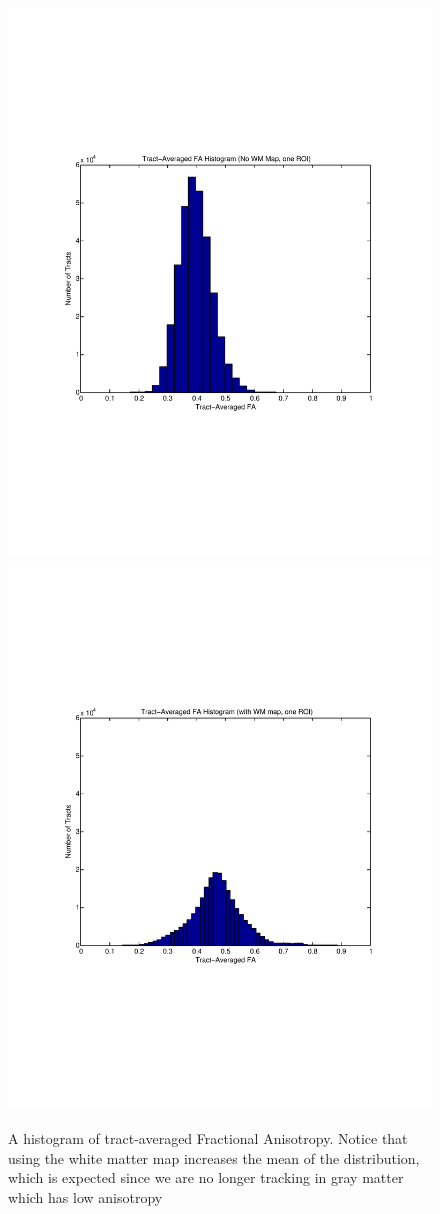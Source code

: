 \begin{figure} \label{fig:singleFAhistograms}
	\includegraphics[trim = 20mm 70mm 20mm 70mm, clip, width=0.5\linewidth]
	  {hist_FA_nomask_single}
	\includegraphics[trim = 20mm 70mm 20mm 70mm, clip, width=0.5\linewidth]
	  {hist_FA_mask_single}
	\caption{A histogram of tract-averaged Fractional Anisotropy.  Notice that using the white matter map increases the mean of the distribution, which is expected since we are no longer tracking in gray matter which has low anisotropy }
\end{figure}

